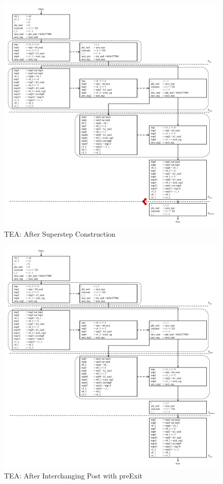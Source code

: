 \begin{figure}[H]
\begin{center}
\includegraphics[width=5.5in]{fig-proposal/tea-after-superstep-construction}
\caption{TEA: After Superstep Construction}
\label{fig:tea-after-superstep-construction}
\end{center}
\end{figure}

\begin{figure}[H]
\begin{center}
\includegraphics[width=5.5in]{fig-proposal/tea-after-interchange-pre-post}
\caption{TEA: After Interchanging Post with preExit}
\label{fig:tea-after-interchange-post-exit}
\end{center}
\end{figure}

